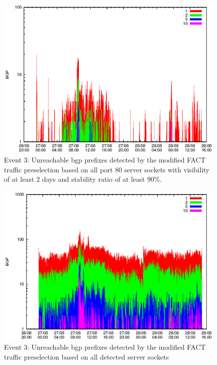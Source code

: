 \begin{figure}
	[p] \centering 
	\includegraphics[width=0.75\linewidth]{images/events/2010_08_27/bgp_log_port80_Set_stab_9_vts_2.eps} \caption{Event 3: Unreachable \gls{bgp} prefixes detected by the modified \gls{FACT} traffic preselection based on all port 80 \glspl{server socket} with visibility of at least 2 days and stability ratio of at least $90\%$.} 
	\label{fig:RIPE_FACT_allSES80VTS2STAB9} 
\end{figure}
\begin{figure}
	[p] \centering 
	\includegraphics[width=0.75\linewidth]{images/events/2010_08_27/bgp_log_all_external.eps} \caption{Event 3: Unreachable \gls{bgp} prefixes detected by the modified \gls{FACT} traffic preselection based on all detected \glspl{server socket}} 
	\label{fig:RIPE_FACT_allSES} 
\end{figure}
